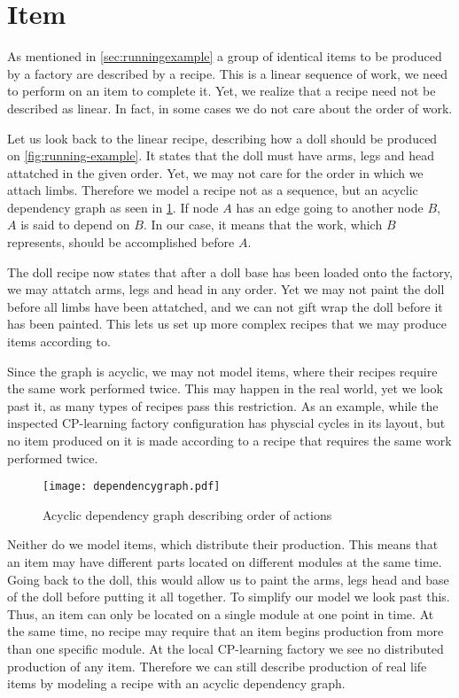 \section{Item}\label{sec:recipe}
As mentioned in \cref{sec:runningexample} a group of identical items to be produced by a factory are described by a recipe. This is a linear sequence of work, we need to perform on an item to complete it. Yet, we realize that a recipe need not be described as linear. In fact, in some cases we do not care about the order of work. 

Let us look back to the linear recipe, describing how a doll should be produced on \cref{fig:running-example}. It states that the doll must have arms, legs and head attatched in the given order. Yet, we may not care for the order in which we attach limbs. Therefore we model a recipe not as a sequence, but an acyclic dependency graph as seen in \cref{fig:dependency-graph}. If node $A$ has an edge going to another node $B$, $A$ is said to depend on $B$. In our case, it means that the work, which $B$ represents, should be accomplished before $A$. 

The doll recipe now states that after a doll base has been loaded onto the factory, we may attatch arms, legs and head in any order. Yet we may not paint the doll before all limbs have been attatched, and we can not gift wrap the doll before it has been painted. This lets us set up more complex recipes that we may produce items according to. 

Since the graph is acyclic, we may not model items, where their recipes require the same work performed twice. This may happen in the real world, yet we look past it, as many types of recipes pass this restriction. As an example, while the inspected CP-learning factory configuration has physcial cycles in its layout, but no item produced on it is made according to a recipe that requires the same work performed twice.  

\begin{figure}[h]
\centering
\texttt{[image: dependencygraph.pdf]}
\caption{Acyclic dependency graph describing order of actions}
\label{fig:dependency-graph}
\end{figure}

Neither do we model items, which distribute their production. This means that an item may have different parts located on different modules at the same time. Going back to the doll, this would allow us to paint the arms, legs head and base of the doll before putting it all together. To simplify our model we look past this. Thus, an item can only be located on a single module at one point in time. At the same time, no recipe may require that an item begins production from more than one specific module. At the local CP-learning factory we see no distributed production of any item. Therefore we can still describe production of real life items by modeling a recipe with an acyclic dependency graph.

